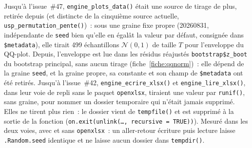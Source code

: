 \documentclass[a4paper,11pt]{article}
\newcommand{\code}[1]{\texttt{\small #1}}
\begin{document}
Jusqu'à l'issue~\#47, \code{engine\_plots\_data()} était une source de tirage de plus, retirée
depuis (et distincte de la cinquième source actuelle, \code{usp\_permutation\_pente()})~: sous une graine
fixe propre (20260831, indépendante de \code{seed} bien qu'elle en égalât la valeur par défaut,
consignée dans \code{\$metadata}), elle tirait 499 échantillons $\mathcal{N}(0,1)$ de taille $T$
pour l'enveloppe du QQ-plot. Depuis, l'enveloppe est lue dans les résidus réajustés
\code{bootstrap\$z\_boot} du bootstrap principal, sans aucun tirage (fiche~\ref{fiche:qqnorm})~:
elle dépend de la graine \code{seed}, et la graine propre, sa constante et son champ de
\code{\$metadata} ont été retirés.
Jusqu'à l'issue~\#42, \code{engine\_ecrire\_xlsx()} et \code{engine\_lire\_xlsx()}, dans leur
voie de repli sans le paquet \code{openxlsx}, tiraient une valeur par \code{runif()}, sans
graine, pour nommer un dossier temporaire qui n'était jamais supprimé. Elles ne tirent plus
rien~: le dossier vient de \code{tempfile()} et est supprimé à la sortie de la fonction
(\code{on.exit(unlink(\dots, recursive = TRUE))}). Mesuré dans les deux voies, avec et sans
\code{openxlsx}~: un aller-retour écriture puis lecture laisse \code{.Random.seed} identique et
ne laisse aucun dossier dans \code{tempdir()}.
\end{document}
